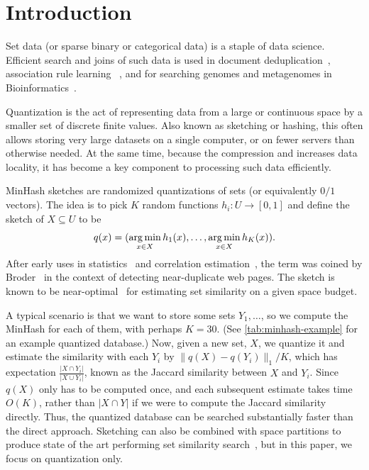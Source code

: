 
\section{Introduction}
Set data (or sparse binary or categorical data) is a staple of data science.
Efficient search and joins of such data is used in document deduplication~\cite{broder1997syntactic}, association rule learning ~\cite{zheng2001real}, and 
for searching genomes and metagenomes in Bioinformatics~\cite{ondov2016mash}.

Quantization is the act of representing data from a large or continuous space by a smaller set of discrete finite values.
Also known as sketching or hashing, this often allows storing very large datasets on a single computer, or on fewer servers than otherwise needed.
At the same time, because the compression and increases data locality, it has become a key component to processing such data efficiently.


MinHash sketches are randomized quantizations of sets (or equivalently $0/1$ vectors).
The idea is to pick $K$ random functions $h_i : U \to [0,1]$ and define the sketch of $X\subseteq U$ to be
\[q(x) = (\operatorname*{arg\,min}_{x\in X}h_1(x), \dots, \operatorname*{arg\,min}_{x\in X}h_K(x)).\]
After early uses in statistics~\cite{brewer1972selecting} and correlation estimation~\cite{flajolet1985probabilistic}, the term was coined by Broder~\cite{broder1997resemblance, broder1997syntactic} in the context of detecting near-duplicate web pages.
The sketch is known to be near-optimal~\cite{pagh2014min} for estimating set similarity on a given space budget.

A typical scenario is that we want to store some sets $Y_1, \dots$, so we compute the MinHash for each of them, with perhaps $K=30$.
(See \cref{tab:minhash-example} for an example quantized database.)
Now, given a new set, $X$, we quantize it and estimate the similarity with each $Y_i$ by $\|q(X)-q(Y_i)\|_1/K$, which has expectation $\frac{|X\cap Y_i|}{|X\cup Y_i|}$, known as the Jaccard similarity between $X$ and $Y_i$.
Since $q(X)$ only has to be computed once, and each subsequent estimate takes time $O(K)$, rather than $|X \cap Y|$ if we were to compute the Jaccard similarity directly.
Thus, the quantized database can be searched substantially faster than the direct approach.
Sketching can also be combined with space partitions to produce state of the art performing set similarity search~\cite{christiani2018scalable}, but in this paper, we focus on quantization only.

